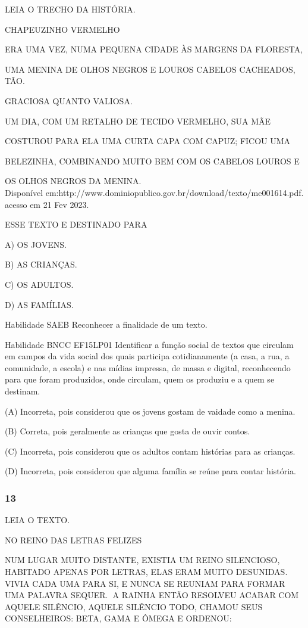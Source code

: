 LEIA O TRECHO DA HISTÓRIA.

CHAPEUZINHO VERMELHO

ERA UMA VEZ, NUMA PEQUENA CIDADE ÀS MARGENS DA FLORESTA,

UMA MENINA DE OLHOS NEGROS E LOUROS CABELOS CACHEADOS, TÃO.

GRACIOSA QUANTO VALIOSA.

UM DIA, COM UM RETALHO DE TECIDO VERMELHO, SUA MÃE

COSTUROU PARA ELA UMA CURTA CAPA COM CAPUZ; FICOU UMA

BELEZINHA, COMBINANDO MUITO BEM COM OS CABELOS LOUROS E

OS OLHOS NEGROS DA MENINA.\\
Disponível
em:http://www.dominiopublico.gov.br/download/texto/me001614.pdf. acesso
em 21 Fev 2023.

ESSE TEXTO E DESTINADO PARA

A) OS JOVENS.

B) AS CRIANÇAS.

C) OS ADULTOS.

D) AS FAMÍLIAS.

Habilidade SAEB Reconhecer a finalidade de um texto.

Habilidade BNCC EF15LP01 Identificar a função social de textos que
circulam em campos da vida social dos quais participa cotidianamente (a
casa, a rua, a comunidade, a escola) e nas mídias impressa, de massa e
digital, reconhecendo para que foram produzidos, onde circulam, quem os
produziu e a quem se destinam.

(A) Incorreta, pois considerou que os jovens gostam de vaidade como a
menina.

(B) Correta, pois geralmente as crianças que gosta de ouvir contos.

(C) Incorreta, pois considerou que os adultos contam histórias para as
crianças.

(D) Incorreta, pois considerou que alguma família se reúne para contar
história.

\subsubsection{13}\label{section-85}

LEIA O TEXTO.

NO REINO DAS LETRAS FELIZES

NUM LUGAR MUITO DISTANTE, EXISTIA UM REINO SILENCIOSO, HABITADO APENAS
POR LETRAS, ELAS ERAM MUITO DESUNIDAS. VIVIA CADA UMA PARA SI, E NUNCA
SE REUNIAM PARA FORMAR UMA PALAVRA SEQUER.\textbf{~}A RAINHA ENTÃO
RESOLVEU ACABAR COM AQUELE SILÊNCIO, AQUELE SILÊNCIO TODO, CHAMOU SEUS
CONSELHEIROS: BETA, GAMA E ÔMEGA E ORDENOU:

